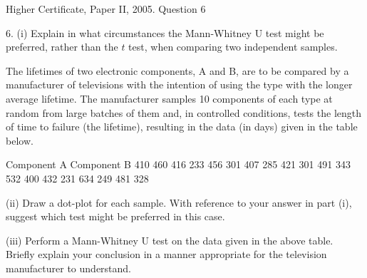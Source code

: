 \documentclass[a4paper,12pt]{article}
\begin{document}
Higher Certificate, Paper II, 2005. Question 6
\begin{framed}
 
6. (i) Explain in what circumstances the Mann-Whitney U test might be preferred, rather than the $t$ test, when comparing two independent samples. 
 
 
The lifetimes of two electronic components, A and B, are to be compared by a manufacturer of televisions with the intention of using the type with the longer average lifetime.  The manufacturer samples 10 components of each type at random from large batches of them and, in controlled conditions, tests the length of time to failure (the lifetime), resulting in the data (in days) given in the table below. 
 
Component A 
Component B 410 460 416 233 456 301 407 285 421 301 491 343 532 400 432 231 634 249 481 328 
 
 
(ii) Draw a dot-plot for each sample.  With reference to your answer in part (i), suggest which test might be preferred in this case. 
 
(iii) Perform a Mann-Whitney U test on the data given in the above table.  Briefly explain your conclusion in a manner appropriate for the television manufacturer to understand. 
 
 
\end{framed}
\end{document}
